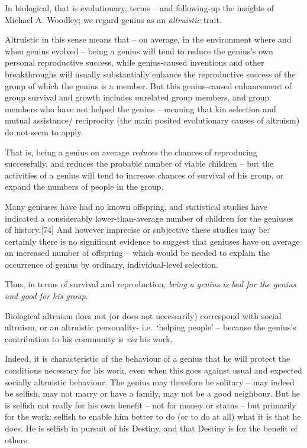 \documentclass[
]{book}
\begin{document}
In biological, that is evolutionary, terms -- and following-up the insights of Michael A. Woodley; we regard genius as an \emph{altruistic} trait.

Altruistic in this sense means that -- on average, in the environment where and when genius evolved -- being a genius will tend to reduce the genius's own personal reproductive success, while genius-caused inventions and other breakthroughs will usually substantially enhance the reproductive success of the group of which the genius is a member. But this genius-caused enhancement of group survival and growth includes unrelated group members, and group members who have not helped the genius -- meaning that kin selection and mutual assistance/ reciprocity (the main posited evolutionary causes of altruism) do not seem to apply.

That is, being a genius on average \emph{reduces} the chances of reproducing successfully, and reduces the probable number of viable children -- but the activities of a genius will tend to increase chances of survival of his group, or expand the numbers of people in the group.

Many geniuses have had no known offspring, and statistical studies have indicated a considerably lower-than-average number of children for the geniuses of history.{[}74{]} And however imprecise or subjective these studies may be: certainly there is no significant evidence to suggest that geniuses have on average an increased number of offspring -- which would be needed to explain the occurrence of genius by ordinary, individual-level selection.

Thus, in terms of survival and reproduction, \emph{being a genius is bad for the genius and good for his group}.

Biological altruism does not (or does not necessarily) correspond with social altruism, or an altruistic personality- i.e.~`helping people' -- because the genius's contribution to his community is \emph{via} his work.

Indeed, it is characteristic of the behaviour of a genius that he will protect the conditions necessary for his work, even when this goes against usual and expected socially altruistic behaviour. The genius may therefore be solitary -- may indeed be selfish, may not marry or have a family, may not be a good neighbour. But he is selfish not really for his own benefit -- not for money or status -- but primarily for the work: selfish to enable him better to do (or to do at all) what it is that he does. He is selfish in pursuit of his Destiny, and that Destiny is for the benefit of others.
\end{document}
